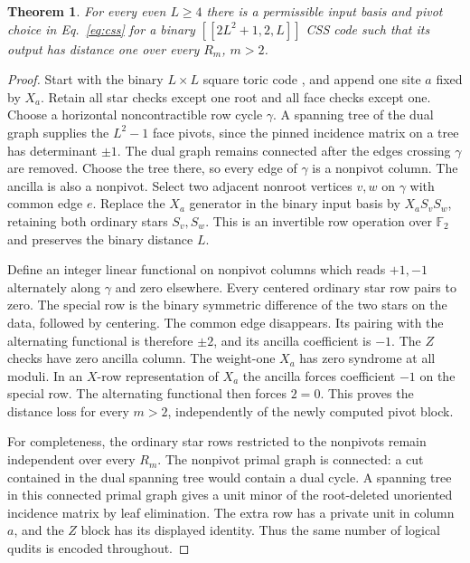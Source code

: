 \documentclass[11pt]{article}
\newtheorem{theorem}{Theorem}
\newcommand{\F}{\mathbb F}
\begin{document}
\begin{theorem}\label{thm:css}
For every even $L\ge4$ there is a permissible input basis and pivot choice in Eq.~\eqref{eq:css} for a binary $[[2L^2+1,2,L]]$ CSS code such that its output has distance one over every $R_m$, $m>2$.
\end{theorem}
\begin{proof}
Start with the binary $L\times L$ square toric code \cite{kitaev,dk}, and append one site $a$ fixed by $X_a$. Retain all star checks except one root and all face checks except one. Choose a horizontal noncontractible row cycle $\gamma$. A spanning tree of the dual graph supplies the $L^2-1$ face pivots, since the pinned incidence matrix on a tree has determinant $\pm1$. The dual graph remains connected after the edges crossing $\gamma$ are removed. Choose the tree there, so every edge of $\gamma$ is a nonpivot column. The ancilla is also a nonpivot. Select two adjacent nonroot vertices $v,w$ on $\gamma$ with common edge $e$. Replace the $X_a$ generator in the binary input basis by $X_aS_vS_w$, retaining both ordinary stars $S_v,S_w$. This is an invertible row operation over $\F_2$ and preserves the binary distance $L$.

Define an integer linear functional on nonpivot columns which reads $+1,-1$ alternately along $\gamma$ and zero elsewhere. Every centered ordinary star row pairs to zero. The special row is the binary symmetric difference of the two stars on the data, followed by centering. The common edge disappears. Its pairing with the alternating functional is therefore $\pm2$, and its ancilla coefficient is $-1$. The $Z$ checks have zero ancilla column. The weight-one $X_a$ has zero syndrome at all moduli. In an $X$-row representation of $X_a$ the ancilla forces coefficient $-1$ on the special row. The alternating functional then forces $2=0$. This proves the distance loss for every $m>2$, independently of the newly computed pivot block.

For completeness, the ordinary star rows restricted to the nonpivots remain independent over every $R_m$. The nonpivot primal graph is connected: a cut contained in the dual spanning tree would contain a dual cycle. A spanning tree in this connected primal graph gives a unit minor of the root-deleted unoriented incidence matrix by leaf elimination. The extra row has a private unit in column $a$, and the $Z$ block has its displayed identity. Thus the same number of logical qudits is encoded throughout.
\end{proof}
\end{document}

